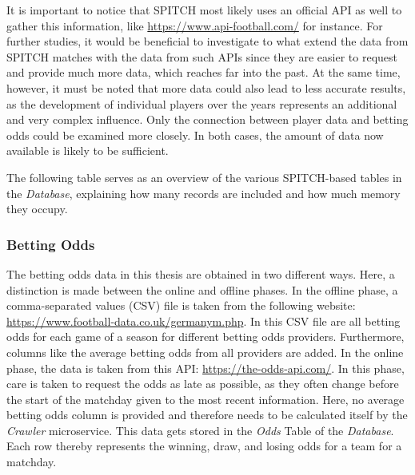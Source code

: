It is important to notice that SPITCH most likely uses an official API as well to gather this information, like \underline{https://www.api-football.com/} for instance. For further studies, it would be beneficial to investigate to what extend the data from SPITCH matches with the data from such APIs since they are easier to request and provide much more data, which reaches far into the past. At the same time, however, it must be noted that more data could also lead to less accurate results, as the development of individual players over the years represents an additional and very complex influence. Only the connection between player data and betting odds could be examined more closely. In both cases, the amount of data now available is likely to be sufficient.

The following table serves as an overview of the various SPITCH-based tables in the \emph{Database}, explaining how many records are included and how much memory they occupy.

\subsubsection{Betting Odds}

The betting odds data in this thesis are obtained in two different ways. Here, a distinction is made between the online and offline phases. In the offline phase, a comma-separated values (CSV) file is taken from the following website: \underline{https://www.football-data.co.uk/germanym.php}. In this CSV file are all betting odds for each game of a season for different betting odds providers. Furthermore, columns like the average betting odds from all providers are added. In the online phase, the data is taken from this API: \underline{https://the-odds-api.com/}. In this phase, care is taken to request the odds as late as possible, as they often change before the start of the matchday given to the most recent information. Here, no average betting odds column is provided and therefore needs to be calculated itself by the \emph{Crawler} microservice. This data gets stored in the \emph{Odds} Table of the \emph{Database}. Each row thereby represents the winning, draw, and losing odds for a team for a matchday.

